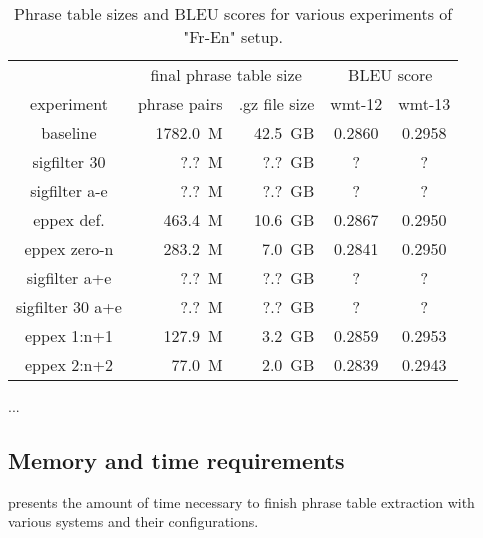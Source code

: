 \begin{table}[ht]
\centering
\begin{tabular}{ | c | r r | c c | }
\hline
 & \multicolumn{2}{|c|}{final phrase table size} & \multicolumn{2}{|c|}{BLEU score} \\
experiment & phrase pairs & .gz file size & wmt-12 & wmt-13 \\
\hline
\hline
baseline          & 1782.0~M & 42.5~GB & 0.2860 & 0.2958 \\ %
sigfilter 30      &    ?.?~M &  ?.?~GB & ? & ? \\ %
sigfilter a-e     &    ?.?~M &  ?.?~GB & ? & ? \\ %
eppex def.        &  463.4~M & 10.6~GB & 0.2867 & 0.2950 \\ %
eppex zero-n      &  283.2~M &  7.0~GB & 0.2841 & 0.2950 \\ %
sigfilter a+e     &    ?.?~M &  ?.?~GB & ? & ? \\ %
sigfilter 30 a+e  &    ?.?~M &  ?.?~GB & ? & ? \\ %
eppex 1:n+1       &  127.9~M &  3.2~GB & 0.2859 & 0.2953 \\ %
eppex 2:n+2       &   77.0~M &  2.0~GB & 0.2839 & 0.2943 \\ %
\hline
\end{tabular}
\caption{\label{fr-en-pt-size-and-bleu}
Phrase table sizes and BLEU scores for various experiments of "Fr-En" setup.}
\end{table}

...

\subsection{Memory and time requirements}

 presents the amount of time necessary to finish
phrase table extraction with various systems and their configurations.

